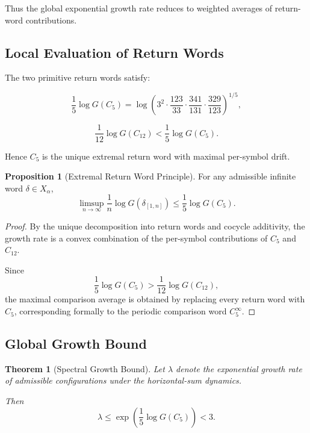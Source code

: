 \documentclass[12pt, oneside]{article}
\numberwithin{equation}{section}
\theoremstyle{definition}
\newtheorem{proposition}{Proposition}[section]
\theoremstyle{plain}
\newtheorem{theorem}{Theorem}[section]
\theoremstyle{remark}
\begin{document}
Thus the global exponential growth rate reduces to weighted averages
of return-word contributions.


\subsection{Local Evaluation of Return Words}

The two primitive return words satisfy:

\[
\frac{1}{5}\log G(C_5)
=
\log\!\left(
3^{2}
\cdot \frac{123}{33}
\cdot \frac{341}{131}
\cdot \frac{329}{123}
\right)^{1/5},
\]

\[
\frac{1}{12}\log G(C_{12})
<
\frac{1}{5}\log G(C_5).
\]

Hence $C_5$ is the unique extremal return word with maximal per-symbol drift.

\begin{proposition}[Extremal Return Word Principle]
For any admissible infinite word $\delta \in X_\alpha$,
\[
\limsup_{n\to\infty}
\frac{1}{n} \log G(\delta_{[1,n]})
\le
\frac{1}{5}\log G(C_5).
\]
\end{proposition}

\begin{proof}
By the unique decomposition into return words and cocycle additivity,
the growth rate is a convex combination of the per-symbol contributions
of $C_5$ and $C_{12}$.

Since
\[
\frac{1}{5}\log G(C_5)
>
\frac{1}{12}\log G(C_{12}),
\]
the maximal comparison average is obtained by replacing every return word with $C_5$,
corresponding formally to the periodic comparison word $C_5^\infty$.
\end{proof}


\subsection{Global Growth Bound}

\begin{theorem}[Spectral Growth Bound]
Let $\lambda$ denote the exponential growth rate of admissible configurations
under the horizontal-sum dynamics.

Then
\[
\lambda
\le
\exp\!\left(\frac{1}{5}\log G(C_5)\right)
< 3.
\]
\end{theorem}
\end{document}
